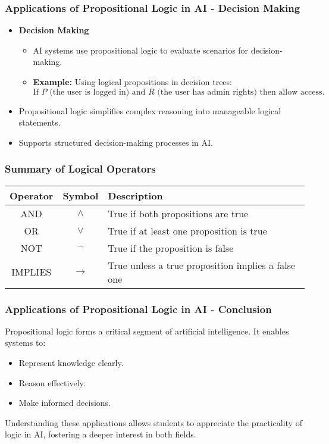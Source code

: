\documentclass[aspectratio=169]{beamer}
\begin{document}
\begin{frame}[fragile]
    \frametitle{Applications of Propositional Logic in AI - Decision Making}
    \begin{itemize}
        \item \textbf{Decision Making}
            \begin{itemize}
                \item AI systems use propositional logic to evaluate scenarios for decision-making.
                \item \textbf{Example:} Using logical propositions in decision trees:
                    \begin{equation}
                    \text{If } P \text{ (the user is logged in) and } R \text{ (the user has admin rights) then allow access.}
                    \end{equation}
                \end{itemize}
        \item Propositional logic simplifies complex reasoning into manageable logical statements.
        \item Supports structured decision-making processes in AI.
    \end{itemize}
\end{frame}

\begin{frame}[fragile]
    \frametitle{Summary of Logical Operators}
    \begin{tabular}{|c|c|l|}
        \hline
        \textbf{Operator} & \textbf{Symbol} & \textbf{Description} \\
        \hline
        AND & $\land$ & True if both propositions are true \\
        \hline
        OR & $\lor$ & True if at least one proposition is true \\
        \hline
        NOT & $\lnot$ & True if the proposition is false \\
        \hline
        IMPLIES & $\rightarrow$ & True unless a true proposition implies a false one \\
        \hline
    \end{tabular}
\end{frame}

\begin{frame}[fragile]
    \frametitle{Applications of Propositional Logic in AI - Conclusion}
    Propositional logic forms a critical segment of artificial intelligence. It enables systems to:

    \begin{itemize}
        \item Represent knowledge clearly.
        \item Reason effectively.
        \item Make informed decisions.
    \end{itemize}
    
    Understanding these applications allows students to appreciate the practicality of logic in AI, fostering a deeper interest in both fields.
\end{frame}
\end{document}
